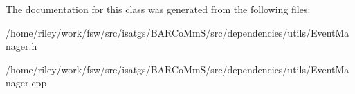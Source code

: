 The documentation for this class was generated from the following files\+:\begin{DoxyCompactItemize}
\item 
/home/riley/work/fsw/src/isatgs/\+B\+A\+R\+Co\+Mm\+S/src/dependencies/utils/Event\+Manager.\+h\item 
/home/riley/work/fsw/src/isatgs/\+B\+A\+R\+Co\+Mm\+S/src/dependencies/utils/Event\+Manager.\+cpp\end{DoxyCompactItemize}
